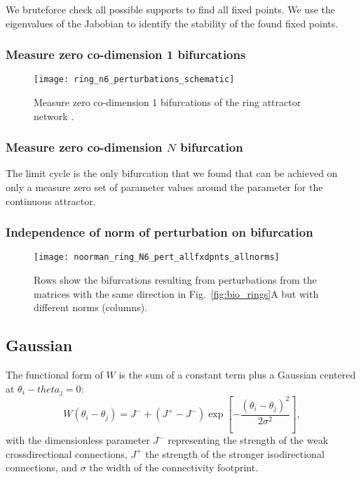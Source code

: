 \documentclass{article} %
\newcounter{ct}
\theoremstyle{definition}
\theoremstyle{remark}
\begin{document}
We bruteforce check all possible supports to find all fixed points.
We use the eigenvalues of the Jabobian to identify the stability of the found fixed points.


\subsubsection{Measure zero co-dimension 1 bifurcations}

\begin{figure}[tbhp]
     \centering
    \texttt{[image: ring\_n6\_perturbations\_schematic]}
       \caption{Measure zero co-dimension 1 bifurcations of the ring attractor network \citep{Noorman2022}.}
         \label{fig:meaure_zero_perturbations}
\end{figure}


\subsubsection{Measure zero co-dimension $N$ bifurcation}
The limit cycle is the only bifurcation that we found that can be achieved on only a measure zero set of parameter values around the parameter for the continuous attractor.






\subsubsection{Independence of norm of perturbation on bifurcation}

\begin{figure}[tbhp]
     \centering
    \texttt{[image: noorman\_ring\_N6\_pert\_allfxdpnts\_allnorms]}
       \caption{Rows show the bifurcations resulting from perturbations from the matrices with the same direction in Fig.~\ref{fig:bio_rings}A but with different norms (columns). }
         \label{fig:noorman_ring_allfxdpnts_allnorm}
\end{figure}




\subsection{Gaussian}\label{sec:supp:goodridge}
\citep{compte2000synaptic}
\citep{seeholzer2017efficient}
\citep{goodridge2000}

The functional form of $W$ is the sum of a constant term plus a Gaussian centered at $\theta_i - theta_j =0$:
\begin{equation}
W(\theta_i - \theta_j) = J^- + (J^+ - J^-) \exp\left[ -\frac{(\theta_i - \theta_j)^2}{2\sigma^2} \right],
\end{equation}
with the dimensionless parameter $J^-$ representing the strength of the weak crossdirectional connections, $J^+$ the strength of the stronger isodirectional connections,
 and $\sigma$ the width of the connectivity footprint.
 
\end{document}
